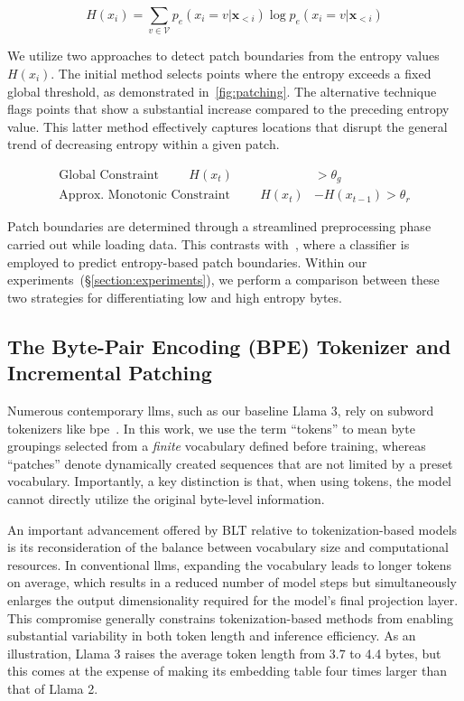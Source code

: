 \begin{equation}
H(x_i) = \sum_{v \in \mathcal{V}} p_{e}(x_i=v|\pmb{x}_{<i}) \log p_{e}(x_i=v|\pmb{x}_{<i})
\end{equation}

We utilize two approaches to detect patch boundaries from the entropy values $H(x_i)$. The initial method selects points where the entropy exceeds a fixed global threshold, as demonstrated in~\autoref{fig:patching}. The alternative technique flags points that show a substantial increase compared to the preceding entropy value. This latter method effectively captures locations that disrupt the general trend of decreasing entropy within a given patch.

\begin{align*}
    \text{Global Constraint}\hspace{1cm}H(x_t)& > \theta_g\\
    \text{Approx. Monotonic Constraint}\hspace{1cm}H(x_t)& - H(x_{t-1}) > \theta_r
\end{align*}

Patch boundaries are determined through a streamlined preprocessing phase carried out while loading data. This contrasts with~\citet{nawrot-etal-2023-efficient}, where a classifier is employed to predict entropy-based patch boundaries. Within our experiments~(\S\ref{section:experiments}), we perform a comparison between these two strategies for differentiating low and high entropy bytes.

\subsection{The Byte-Pair Encoding (BPE) Tokenizer and Incremental Patching}
\label{section:incremental-patching}
\label{section:bpe-patch}

Numerous contemporary llms, such as our baseline Llama 3, rely on subword tokenizers like bpe~\citep{gage1994new, sennrich-etal-2016-neural}. In this work, we use the term ``tokens'' to mean byte groupings selected from a \textit{finite} vocabulary defined before training, whereas ``patches'' denote dynamically created sequences that are not limited by a preset vocabulary. Importantly, a key distinction is that, when using tokens, the model cannot directly utilize the original byte-level information.

An important advancement offered by {\textsc BLT} relative to tokenization-based models is its reconsideration of the balance between vocabulary size and computational resources. In conventional llms, expanding the vocabulary leads to longer tokens on average, which results in a reduced number of model steps but simultaneously enlarges the output dimensionality required for the model’s final projection layer. This compromise generally constrains tokenization-based methods from enabling substantial variability in both token length and inference efficiency. As an illustration, Llama 3 raises the average token length from 3.7 to 4.4 bytes, but this comes at the expense of making its embedding table four times larger than that of Llama 2.

